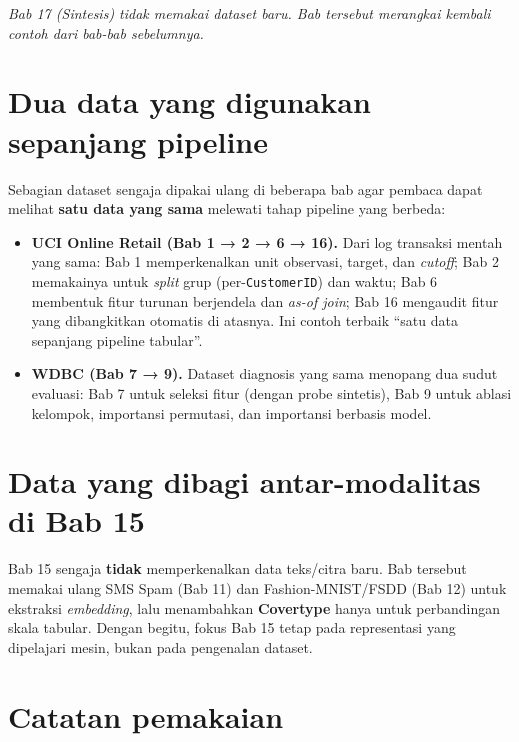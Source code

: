 \emph{Bab 17 (Sintesis) tidak memakai dataset baru. Bab tersebut merangkai kembali contoh dari
bab-bab sebelumnya.}

\section{Dua data yang digunakan sepanjang pipeline}\label{dua-data-yang-digunakan-sepanjang-pipeline}

Sebagian dataset sengaja dipakai ulang di beberapa bab agar pembaca dapat
melihat \textbf{satu data yang sama} melewati tahap pipeline yang berbeda:

\begin{itemize}
\tightlist
\item
  \textbf{UCI Online Retail (Bab 1 → 2 → 6 → 16).} Dari log transaksi mentah yang
  sama: Bab 1 memperkenalkan unit observasi, target, dan \emph{cutoff}; Bab 2
  memakainya untuk \emph{split} grup (per-\passthrough{\lstinline!CustomerID!}) dan waktu; Bab 6 membentuk
  fitur turunan berjendela dan \emph{as-of join}; Bab 16 mengaudit fitur yang
  dibangkitkan otomatis di atasnya. Ini contoh terbaik ``satu data sepanjang
  pipeline tabular''.
\item
  \textbf{WDBC (Bab 7 → 9).} Dataset diagnosis yang sama menopang dua sudut evaluasi:
  Bab 7 untuk seleksi fitur (dengan probe sintetis), Bab 9 untuk ablasi
  kelompok, importansi permutasi, dan importansi berbasis model.
\end{itemize}

\section{Data yang dibagi antar-modalitas di Bab 15}\label{data-yang-dibagi-antar-modalitas-di-bab-15}

Bab 15 sengaja \textbf{tidak} memperkenalkan data teks/citra baru. Bab tersebut memakai ulang
SMS Spam (Bab 11) dan Fashion-MNIST/FSDD (Bab 12) untuk ekstraksi \emph{embedding},
lalu menambahkan \textbf{Covertype} hanya untuk perbandingan skala tabular. Dengan
begitu, fokus Bab 15 tetap pada representasi yang dipelajari mesin, bukan pada
pengenalan dataset.

\section{Catatan pemakaian}\label{catatan-pemakaian}

